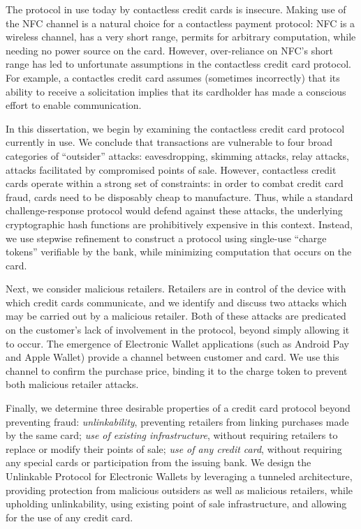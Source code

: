 The protocol in use today by contactless credit cards is insecure.
Making use of the NFC channel is a natural choice for a contactless payment protocol:
    NFC is a wireless channel, has a very short range, permits for arbitrary computation, while needing no power source on the card.
However, over-reliance on NFC's short range has led to unfortunate assumptions in the contactless credit card protocol.
For example, a contactles credit card assumes (sometimes incorrectly) that its ability to receive a solicitation implies that its cardholder has made a conscious effort to enable communication.

In this dissertation, we begin by examining the contactless credit card protocol currently in use.
We conclude that transactions are vulnerable to four broad categories of ``outsider'' attacks:
  eavesdropping, skimming attacks, relay attacks, attacks facilitated by compromised points of sale.
However, contactless credit cards operate within a strong set of constraints:
    in order to combat credit card fraud, cards need to be disposably cheap to manufacture.
Thus, while a standard challenge-response protocol would defend against these attacks,
    the underlying cryptographic hash functions are prohibitively expensive in this context.
Instead, we use stepwise refinement to construct a protocol using single-use ``charge tokens'' verifiable by the bank, while minimizing computation that occurs on the card.

Next, we consider malicious retailers.
Retailers are in control of the device with which credit cards communicate,
    and we identify and discuss two attacks which may be carried out by a malicious retailer.
Both of these attacks are predicated on the customer's lack of involvement in the protocol, beyond simply allowing it to occur.
The emergence of Electronic Wallet applications (such as Android Pay and Apple Wallet) provide a channel between customer and card.
We use this channel to confirm the purchase price, binding it to the charge token to prevent both malicious retailer attacks.

Finally, we determine three desirable properties of a credit card protocol beyond preventing fraud:
    \emph{unlinkability}, preventing retailers from linking purchases made by the same card;
    \emph{use of existing infrastructure}, without requiring retailers to replace or modify their points of sale;
    \emph{use of any credit card}, without requiring any special cards or participation from the issuing bank.
We design the Unlinkable Protocol for Electronic Wallets by leveraging a tunneled architecture,
    providing protection from malicious outsiders as well as malicious retailers,
    while upholding unlinkability, using existing point of sale infrastructure, and allowing for the use of any credit card.
